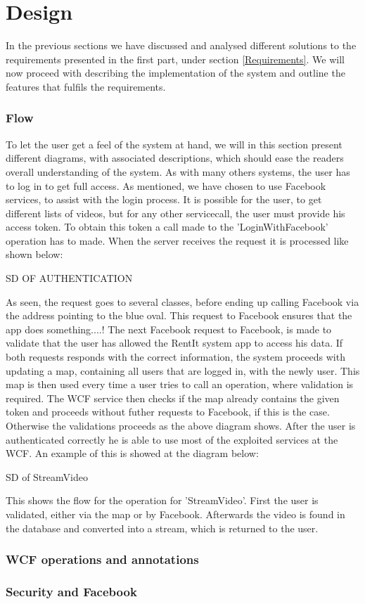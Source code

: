\part{Design}
In the previous sections we have discussed and analysed different solutions to the requirements presented in the first part, under section \ref{Requirements}. We will now proceed with describing the implementation of the system and outline the features that fulfils the requirements.

\section{Flow}
To let the user get a feel of the system at hand, we will in this section present different diagrams, with associated descriptions, which should ease the readers overall understanding of the system.
As with many others systems, the user has to log in to get full access. As mentioned, we have chosen to use Facebook services, to assist with the login process. It is possible for the user, to get different lists of videos, but for any other servicecall, the user must provide his access token. To obtain this token a call made to the 'LoginWithFacebook' operation has to made. When the server receives the request it is processed like shown below:

SD OF AUTHENTICATION

As seen, the request goes to several classes, before ending up calling Facebook via the address pointing to the blue oval. This request to Facebook ensures that the app does something....!
The next Facebook request to Facebook, is made to validate that the user has allowed the RentIt system app to access his data. If both requests responds with the correct information, the system proceeds with updating a map, containing all users that are logged in, with the newly user. This map is then used every time a user tries to call an operation, where validation is required. The WCF service then checks if the map already contains the given token and proceeds without futher requests to Facebook, if this is the case. Otherwise the validations proceeds as the above diagram shows. 
After the user is authenticated correctly he is able to use most of the exploited services at the WCF. An example of this is showed at the diagram below:

SD of StreamVideo

This shows the flow for the operation for 'StreamVideo'. First the user is validated, either via the map or by Facebook. Afterwards the video is found in the database and converted into a stream, which is returned to the user. 


\section{WCF operations and annotations}


\section{Security and Facebook}



